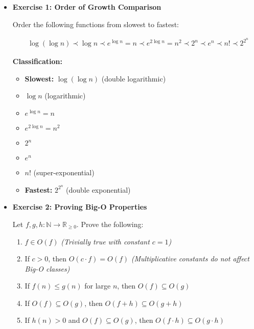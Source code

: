 \documentclass[11pt]{article}
\begin{document}
\begin{itemize}[leftmargin=*]

\item \textbf{Exercise 1: Order of Growth Comparison}

Order the following functions from slowest to fastest:

\[
\begin{aligned}
&\log(\log n) \prec \log n \prec e^{\log n} = n \prec e^{2 \log n} = n^2 \prec 2^n \prec e^n \prec n! \prec 2^{2^n}
\end{aligned}
\]

\textbf{Classification:}
\begin{itemize}
    \item \textbf{Slowest:} \( \log(\log n) \) (double logarithmic)
    \item \( \log n \) (logarithmic)
    \item \( e^{\log n} = n \)
    \item \( e^{2 \log n} = n^2 \)
    \item \( 2^n \)
    \item \( e^n \)
    \item \( n! \) (super-exponential)
    \item \textbf{Fastest:} \( 2^{2^n} \) (double exponential)
\end{itemize}

\vspace{1em}

\item \textbf{Exercise 2: Proving Big-O Properties}

Let \( f, g, h : \mathbb{N} \to \mathbb{R}_{\geq 0} \). Prove the following:

\begin{enumerate}
    \item \( f \in O(f) \)  
    \textit{(Trivially true with constant \( c = 1 \))}

    \item If \( c > 0 \), then \( O(c \cdot f) = O(f) \)  
    \textit{(Multiplicative constants do not affect Big-O classes)}

    \item If \( f(n) \leq g(n) \) for large \( n \), then \( O(f) \subseteq O(g) \)

    \item If \( O(f) \subseteq O(g) \), then \( O(f + h) \subseteq O(g + h) \)

    \item If \( h(n) > 0 \) and \( O(f) \subseteq O(g) \), then \( O(f \cdot h) \subseteq O(g \cdot h) \)
\end{enumerate}


\end{itemize}
\end{document}
